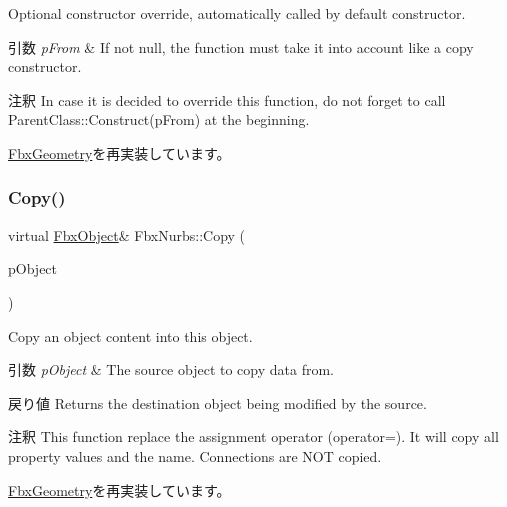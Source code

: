 Optional constructor override, automatically called by default constructor. 
\begin{DoxyParams}{引数}
{\em p\+From} & If not null, the function must take it into account like a copy constructor. \\
\hline
\end{DoxyParams}
\begin{DoxyRemark}{注釈}
In case it is decided to override this function, do not forget to call Parent\+Class\+::\+Construct(p\+From) at the beginning. 
\end{DoxyRemark}


\hyperlink{class_fbx_geometry_a26ca96a86f17783c45ff83b33d2b5324}{Fbx\+Geometry}を再実装しています。

\mbox{\label{class_fbx_nurbs_ac7c9a9018b4fdbe72b258a2fa0a3367d}} 
\subsubsection{\texorpdfstring{Copy()}{Copy()}}
{\footnotesize\ttfamily virtual \hyperlink{class_fbx_object}{Fbx\+Object}\& Fbx\+Nurbs\+::\+Copy (\begin{DoxyParamCaption}\item[{const \hyperlink{class_fbx_object}{Fbx\+Object} \&}]{p\+Object }\end{DoxyParamCaption})\hspace{0.3cm}{\ttfamily [virtual]}}

Copy an object content into this object. 
\begin{DoxyParams}{引数}
{\em p\+Object} & The source object to copy data from. \\
\hline
\end{DoxyParams}
\begin{DoxyReturn}{戻り値}
Returns the destination object being modified by the source. 
\end{DoxyReturn}
\begin{DoxyRemark}{注釈}
This function replace the assignment operator (operator=). It will copy all property values and the name. Connections are N\+OT copied. 
\end{DoxyRemark}


\hyperlink{class_fbx_geometry_aac1cee4251e3d5fbd27f1181c58b83b3}{Fbx\+Geometry}を再実装しています。

\mbox{\label{class_fbx_nurbs_a8a5ea388bc948e47ab65e1705f98f402}} 

